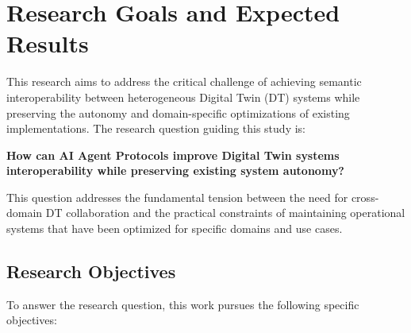 
\chapter{Research Goals and Expected Results}
\label{chap:objectives}

This research aims to address the critical challenge of achieving semantic interoperability between heterogeneous Digital Twin (DT) systems while preserving the autonomy and domain-specific optimizations of existing implementations.
The research question guiding this study is:

\textbf{How can AI Agent Protocols improve Digital Twin systems interoperability while preserving existing system autonomy?}

This question addresses the fundamental tension between the need for cross-domain DT collaboration and the practical constraints of maintaining operational systems that have been optimized for specific domains and use cases.

\section{Research Objectives}
\label{sec:objectives}

To answer the research question, this work pursues the following specific objectives:

